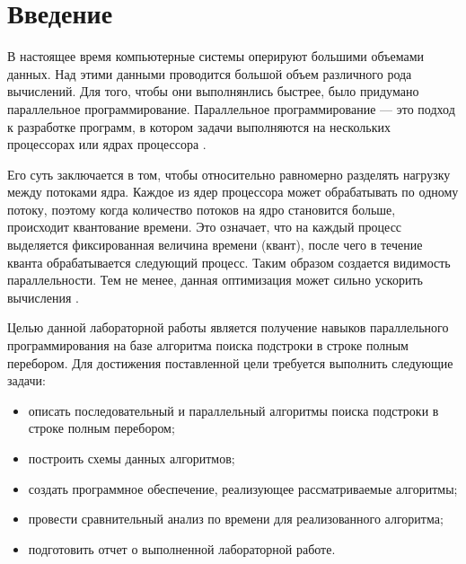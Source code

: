 \chapter*{\centering Введение}

В настоящее время компьютерные системы оперируют большими объемами данных. 
Над этими данными проводится большой объем различного рода вычислений. 
Для того, чтобы они выполнянлись быстрее, было придумано параллельное программирование.
Параллельное программирование --- это подход к разработке программ, в котором задачи выполняются на нескольких процессорах или ядрах процессора \cite{multi}.

Его суть заключается в том, чтобы относительно равномерно разделять нагрузку между потоками ядра.
Каждое из ядер процессора может обрабатывать по одному потоку, поэтому когда количество потоков на ядро становится больше, происходит квантование времени.
Это означает, что на каждый процесс выделяется фиксированная величина времени (квант), после чего в течение кванта обрабатывается следующий процесс. 
Таким образом создается видимость параллельности. 
Тем не менее, данная оптимизация может сильно ускорить вычисления \cite{multi2}.

Целью данной лабораторной работы является получение навыков параллельного программирования на базе алгоритма поиска подстроки в строке полным перебором.
Для достижения поставленной цели требуется выполнить следующие задачи:

\begin{itemize}
	\item описать последовательный и параллельный алгоритмы поиска подстроки в строке полным перебором;
	\item построить схемы данных алгоритмов;
	\item создать программное обеспечение, реализующее рассматриваемые алгоритмы;
	\item провести сравнительный анализ по времени для реализованного алгоритма;
	\item подготовить отчет о выполненной лабораторной работе.
\end{itemize}